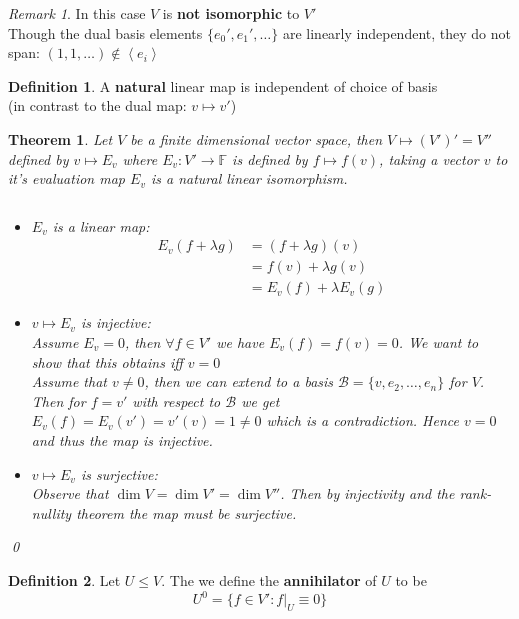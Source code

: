 \documentclass[11pt, a4paper]{report}
\makeatletter
\numberwithin{equation}{section}
\newcommand{\B}{\mathcal{B}}
\newcommand{\F}{\mathbb{F}}
\newcommand{\spn}[1]{\left\langle #1 \right\rangle}
\newcommand{\nin}{\not\in}
\numberwithin{equation}{subsection}
\theoremstyle{plain}
\newtheorem{thm}{Theorem}[chapter] %
\theoremstyle{definition}
\newtheorem{defn}{Definition}[chapter]
\theoremstyle{remark}
\newtheorem*{rem}{Remark}
\newtheorem*{prf}{Proof}
\renewenvironment{prf}[1][\proofname]{\par
  \vspace{-\topsep}%
  \normalfont
  \topsep0pt \partopsep0pt %
  \trivlist
  \item[\hskip\labelsep
        \itshape
    #1\@addpunct{.}]\ignorespaces
}{%
  \popQED\endtrivlist\@endpefalse
  \addvspace{6pt plus 6pt} %
}
\newcommand{\pr}[1]{\begin{adjustwidth}{1cm}{} \begin{prf} #1 \end{prf} \end{adjustwidth}}
\makeatother
\begin{document}
\begin{rem}
In this case $V$ is \textbf{not isomorphic} to $V'$\\
Though the dual basis elements $\{ e_0', e_1', \ldots \}$ are linearly independent, they do not span: $(1,1,\ldots) \nin \spn{e_i}$
\end{rem}

\begin{defn} 
A \textbf{natural} linear map is independent of choice of basis\\ (in contrast to the dual map: $v \mapsto v'$)
\end{defn}

\newpage

\begin{thm}
Let $V$ be a finite dimensional vector space, then $V \mapsto (V')' = V''$ defined by $v \mapsto E_v$ where $E_v : V' \to \F$ is defined by $f \mapsto f(v)$, taking a vector $v$ to it's evaluation map $E_v$ is a natural linear isomorphism.

\pr{${}$
\begin{itemize}
\item $E_v$ is a linear map:
\begin{align*}
E_v (f + \lambda g)	&= (f + \lambda g)(v)\\
					&= f(v) + \lambda g(v)\\
					&= E_v(f) + \lambda E_v(g)
\end{align*}

\item $v \mapsto E_v$ is injective:\\
Assume $E_v = 0$, then $\forall f \in V'$ we have $E_v(f) = f(v) = 0$. We want to show that this obtains iff $v = 0$\\
Assume that $v \neq 0$, then we can extend to a basis $\B = \{v, e_2, \ldots, e_n\}$ for $V$. Then for $f = v'$ with respect to $\B$ we get $E_v(f) = E_v(v') = v'(v) = 1 \neq 0$ which is a contradiction. Hence $v = 0$ and thus the map is injective.

\item $v \mapsto E_v$ is surjective:\\
Observe that $\dim V = \dim V' = \dim V''$. Then by injectivity and the rank-nullity theorem the map must be surjective. 
\end{itemize}
}\qed
\end{thm}

\begin{defn}
Let $U \leq V$. The we define the \textbf{annihilator} of $U$ to be
$$U^0 = \{ f \in V' : f|_U \equiv 0 \}$$
\end{defn}
\end{document}
